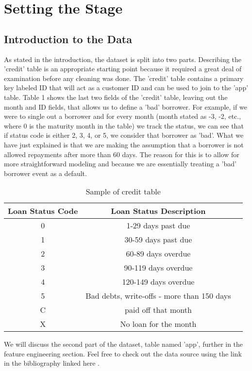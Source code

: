 \documentclass[12pt]{article}
\begin{document}
\section{Setting the Stage}
\subsection{Introduction to the Data}
As stated in the introduction, the dataset is split into two parts. 
Describing the 'credit' table is an appropriate starting point because it required a great deal of examination before any cleaning was done.
The 'credit' table contains a primary key labeled ID that will act as a customer ID and can be used to join to the 'app' table. 
Table 1 shows the last two fields of the 'credit' table, leaving out the month and ID fields, that allows us to define a 'bad' borrower.
For example, if we were to single out a borrower and for every month (month stated as -3, -2, etc., where 0 is the maturity month in the table) we track the status,
we can see that if status code is either 2, 3, 4, or 5, we consider that borrower as 'bad'.
What we have just explained is that we are making the assumption that a borrower is not allowed repayments after more than 60 days.
The reason for this is to allow for more straightforward modeling and because we are essentially treating a 'bad' borrower event as a default.

\begin{table}[h!]
    \centering
    \begin{tabular}{|c|c|c|}
    \hline
    \textbf{Loan Status Code} & \textbf{Loan Status Description} \\ \hline
    0 & 1-29 days past due \\ \hline
    1 & 30-59 days past due \\ \hline
    2 & 60-89 days overdue \\ \hline
    3 & 90-119 days overdue \\ \hline
    4 & 120-149 days overdue \\ \hline
    5 & Bad debts, write-offs - more than 150 days \\ \hline
    C & paid off that month\\ \hline
    X & No loan for the month\\ \hline
    \end{tabular}
    \caption{Sample of credit table}
    \label{tab:simple_table}
\end{table}

We will discuss the second part of the dataset, table named 'app', further in the feature engineering section.
Feel free to check out the data source using the link in the bibliography linked here \cite{website2023}.
\end{document}
